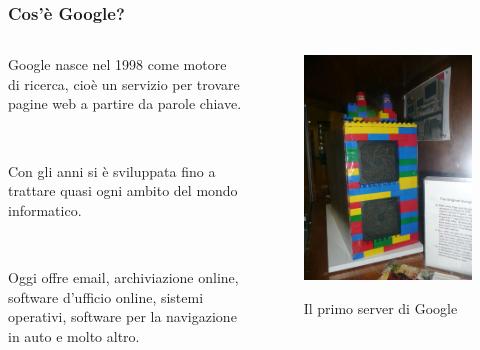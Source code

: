 \documentclass[]{beamer}
\begin{document}
\begin{frame}
\frametitle{Cos'è Google?}
\begin{columns}
  \begin{column}{.5\textwidth}
    Google nasce nel 1998 come \alert{motore di ricerca}, cioè un servizio per trovare pagine web a partire da parole chiave.\pause

~

Con gli anni si è sviluppata fino a trattare quasi ogni ambito del mondo informatico.\pause

~

Oggi offre email, archiviazione online, software d'ufficio online, sistemi operativi, software per la navigazione in auto e molto altro.
  \end{column}
  \begin{column}{.4\textwidth}
    \begin{figure}
      \includegraphics[width=\columnwidth]{img/servergoogle.jpg}

      Il primo server di Google
    \end{figure}
  \end{column}
  \end{columns}
\end{frame}
\end{document}
